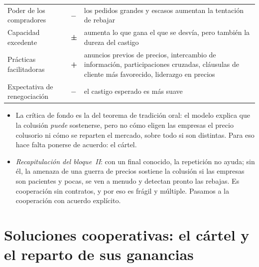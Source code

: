 \documentclass[11pt]{article}
\begin{document}
\begin{table}[H]
\begin{tabular}{>{\raggedright\arraybackslash}m{3.9cm}>{\centering\arraybackslash}m{1.1cm}>{\raggedright\arraybackslash}m{9.0cm}}
\addlinespace[0.3em]
Poder de los compradores & \textcolor{tceerojo}{\textbf{$-$}} & los pedidos grandes y escasos aumentan la tentación de rebajar\nocite{Snyder1996Dynamic}\\
\addlinespace[0.3em]
Capacidad excedente & \textcolor{tceedorado}{\textbf{±}} & aumenta lo que gana el que se desvía, pero también la dureza del castigo\nocite{BrockScheinkman1985Price}\\
\addlinespace[0.3em]
Prácticas facilitadoras & \textcolor{tceeverde}{\textbf{+}} & anuncios previos de precios, intercambio de información, participaciones cruzadas, cláusulas de cliente más favorecido\nocite{Cooper1986Most}, liderazgo en precios\\
\addlinespace[0.3em]
Expectativa de renegociación & \textcolor{tceerojo}{\textbf{$-$}} & el castigo esperado es más suave\\
\bottomrule
\end{tabular}
\end{table}

\begin{itemize}
\item La crítica de fondo es la del teorema de tradición oral: el modelo explica que la colusión \emph{puede} sostenerse, pero no cómo eligen las empresas el precio colusorio ni cómo se reparten el mercado, sobre todo si son distintas. Para eso hace falta ponerse de acuerdo: el cártel.
\item \emph{Recapitulación del bloque~II}: con un final conocido, la repetición no ayuda; sin él, la amenaza de una guerra de precios sostiene la colusión si las empresas son pacientes y pocas, se ven a menudo y detectan pronto las rebajas. Es cooperación sin contratos, y por eso es frágil y múltiple. Pasamos a la cooperación con acuerdo explícito.
\end{itemize}

\section{Soluciones cooperativas:\cortetitulo{} el cártel y el reparto de sus ganancias}\label{sec:soluciones-cooperativas}
\end{document}
